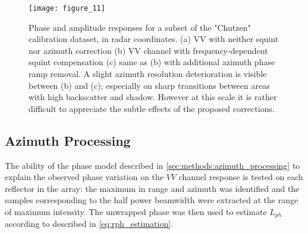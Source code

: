\begin{figure*}[ht]
	\centering
	\texttt{[image: figure\_11]}
	\caption{Phase and amplitude responses for a subset of the "Chutzen" calibration dataset, in radar coordinates. (a) VV with neither squint nor azimuth correction (b) VV channel with frequency-dependent squint compensation (c) same as (b) with additional azimuth phase ramp removal. A slight azimuth resolution deterioration is visible between (b) and (c); especially on sharp transitions between areas with high backscatter and shadow. However at this scale it is rather difficult to appreciate the subtle effects of the proposed corrections.}
	\label{fig:scene_mph}
\end{figure*}


\subsection{Azimuth Processing}\label{sec:results:azimuth_processing}
The ability of the phase model described in \autoref{sec:methods:azimuth_processing} to explain the observed phase variation  on the $VV$ channel response is tested on each reflector in the array: the maximum in range and azimuth was identified and the samples corresponding to the half power beamwidth were extracted at the range of maximum intensity. The unwrapped phase was then used to estimate $L_{ph}$ according to described in \autoref{eq:rph_estimation}.

